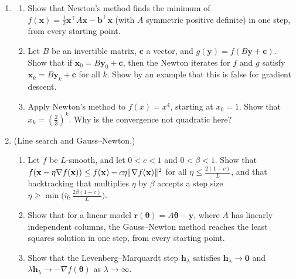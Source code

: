 \begin{enumerate}[leftmargin=*]
\begin{enumerate}[label=(\alph*)]
        \item Find the best step size and the corresponding rate $\rho$. How many steps are needed to reduce the error by a factor $10^{-6}$?
        \item Substitute $x_2 = \frac{u}{3}$. How does the function look in the variables $(x_1, u)$, and how many steps does gradient descent need now with the best step size?
    \end{enumerate}
    \item \begin{enumerate}[label=(\alph*)]
        \item Show that Newton's method finds the minimum of $f(\mathbf{x}) = \frac{1}{2}\mathbf{x}^\top A\mathbf{x} - \mathbf{b}^\top\mathbf{x}$ (with $A$ symmetric positive definite) in one step, from every starting point.
        \item Let $B$ be an invertible matrix, $\mathbf{c}$ a vector, and $g(\mathbf{y}) = f(B\mathbf{y} + \mathbf{c})$. Show that if $\mathbf{x}_0 = B\mathbf{y}_0 + \mathbf{c}$, then the Newton iterates for $f$ and $g$ satisfy $\mathbf{x}_k = B\mathbf{y}_k + \mathbf{c}$ for all $k$. Show by an example that this is false for gradient descent.
        \item Apply Newton's method to $f(x) = x^4$, starting at $x_0 = 1$. Show that $x_k = (\frac{2}{3})^k$. Why is the convergence not quadratic here?
    \end{enumerate}
    \item\label{L3-ex3:armijo} (Line search and Gauss--Newton.)
    \begin{enumerate}[label=(\alph*)]
        \item Let $f$ be $L$-smooth, and let $0 < c < 1$ and $0 < \beta < 1$. Show that $f(\mathbf{x} - \eta\nabla f(\mathbf{x})) \leq f(\mathbf{x}) - c\eta\lVert \nabla f(\mathbf{x}) \rVert^2$ for all $\eta \leq \frac{2(1 - c)}{L}$, and that backtracking that multiplies $\eta$ by $\beta$ accepts a step size $\eta \geq \min\big(\bar\eta, \frac{2\beta(1 - c)}{L}\big)$.
        \item Show that for a linear model $\mathbf{r}(\boldsymbol{\theta}) = A\boldsymbol{\theta} - \mathbf{y}$, where $A$ has linearly independent columns, the Gauss--Newton method reaches the least squares solution in one step, from every starting point.
        \item Show that the Levenberg--Marquardt step $\mathbf{h}_\lambda$ satisfies $\mathbf{h}_\lambda \to \mathbf{0}$ and $\lambda\mathbf{h}_\lambda \to -\nabla f(\boldsymbol{\theta})$ as $\lambda \to \infty$.

\end{enumerate}
\end{enumerate}
